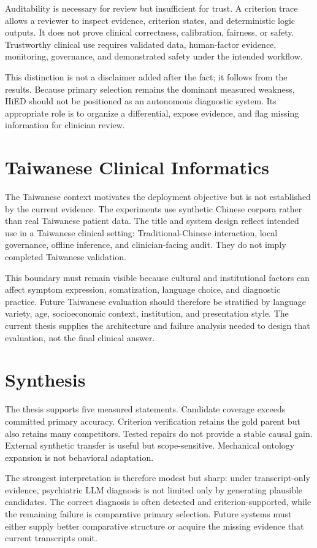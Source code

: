 Auditability is necessary for review but insufficient for trust. A criterion trace allows a reviewer to inspect evidence, criterion states, and deterministic logic outputs. It does not prove clinical correctness, calibration, fairness, or safety. Trustworthy clinical use requires validated data, human-factor evidence, monitoring, governance, and demonstrated safety under the intended workflow.

This distinction is not a disclaimer added after the fact; it follows from the results. Because primary selection remains the dominant measured weakness, HiED should not be positioned as an autonomous diagnostic system. Its appropriate role is to organize a differential, expose evidence, and flag missing information for clinician review.

\section{Taiwanese Clinical Informatics}

The Taiwanese context motivates the deployment objective but is not established by the current evidence. The experiments use synthetic Chinese corpora rather than real Taiwanese patient data. The title and system design reflect intended use in a Taiwanese clinical setting: Traditional-Chinese interaction, local governance, offline inference, and clinician-facing audit. They do not imply completed Taiwanese validation.

This boundary must remain visible because cultural and institutional factors can affect symptom expression, somatization, language choice, and diagnostic practice. Future Taiwanese evaluation should therefore be stratified by language variety, age, socioeconomic context, institution, and presentation style. The current thesis supplies the architecture and failure analysis needed to design that evaluation, not the final clinical answer.

\section{Synthesis}

The thesis supports five measured statements. Candidate coverage exceeds committed primary accuracy. Criterion verification retains the gold parent but also retains many competitors. Tested repairs do not provide a stable causal gain. External synthetic transfer is useful but scope-sensitive. Mechanical ontology expansion is not behavioral adaptation.

The strongest interpretation is therefore modest but sharp: under transcript-only evidence, psychiatric LLM diagnosis is not limited only by generating plausible candidates. The correct diagnosis is often detected and criterion-supported, while the remaining failure is comparative primary selection. Future systems must either supply better comparative structure or acquire the missing evidence that current transcripts omit.
